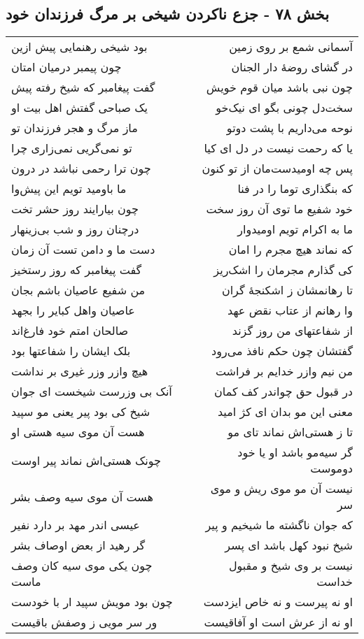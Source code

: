 \begin{center}
\section*{بخش ۷۸ - جزع ناکردن شیخی بر مرگ فرزندان خود}
\label{sec:sh078}
\begin{longtable}{l p{0.5cm} r}
بود شیخی رهنمایی پیش ازین
&&
آسمانی شمع بر روی زمین
\\
چون پیمبر درمیان امتان
&&
در گشای روضهٔ دار الجنان
\\
گفت پیغامبر که شیخ رفته پیش
&&
چون نبی باشد میان قوم خویش
\\
یک صباحی گفتش اهل بیت او
&&
سخت‌دل چونی بگو ای نیک‌خو
\\
ماز مرگ و هجر فرزندان تو
&&
نوحه می‌داریم با پشت دوتو
\\
تو نمی‌گریی نمی‌زاری چرا
&&
یا که رحمت نیست در دل ای کیا
\\
چون ترا رحمی نباشد در درون
&&
پس چه اومیدست‌مان از تو کنون
\\
ما باومید تویم این پیش‌وا
&&
که بنگذاری توما را در فنا
\\
چون بیارایند روز حشر تخت
&&
خود شفیع ما توی آن روز سخت
\\
درچنان روز و شب بی‌زینهار
&&
ما به اکرام تویم اومیدوار
\\
دست ما و دامن تست آن زمان
&&
که نماند هیچ مجرم را امان
\\
گفت پیغامبر که روز رستخیز
&&
کی گذارم مجرمان را اشک‌ریز
\\
من شفیع عاصیان باشم بجان
&&
تا رهانمشان ز اشکنجهٔ گران
\\
عاصیان واهل کبایر را بجهد
&&
وا رهانم از عتاب نقض عهد
\\
صالحان امتم خود فارغ‌اند
&&
از شفاعتهای من روز گزند
\\
بلک ایشان را شفاعتها بود
&&
گفتشان چون حکم نافذ می‌رود
\\
هیچ وازر وزر غیری بر نداشت
&&
من نیم وازر خدایم بر فراشت
\\
آنک بی وزرست شیخست ای جوان
&&
در قبول حق چواندر کف کمان
\\
شیخ کی بود پیر یعنی مو سپید
&&
معنی این مو بدان ای کژ امید
\\
هست آن موی سیه هستی او
&&
تا ز هستی‌اش نماند تای مو
\\
چونک هستی‌اش نماند پیر اوست
&&
گر سیه‌مو باشد او یا خود دوموست
\\
هست آن موی سیه وصف بشر
&&
نیست آن مو موی ریش و موی سر
\\
عیسی اندر مهد بر دارد نفیر
&&
که جوان ناگشته ما شیخیم و پیر
\\
گر رهید از بعض اوصاف بشر
&&
شیخ نبود کهل باشد ای پسر
\\
چون یکی موی سیه کان وصف ماست
&&
نیست بر وی شیخ و مقبول خداست
\\
چون بود مویش سپید ار با خودست
&&
او نه پیرست و نه خاص ایزدست
\\
ور سر مویی ز وصفش باقیست
&&
او نه از عرش است او آفاقیست
\\
\end{longtable}
\end{center}
